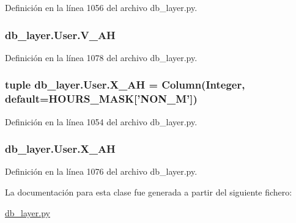 Definición en la línea 1056 del archivo db\-\_\-layer.\-py.

\hypertarget{classdb__layer_1_1_user_ae3a5a2f62fd59fb8e1527e18c5dd4681}{
\subsubsection[{V\-\_\-\-A\-H}]{\setlength{\rightskip}{0pt plus 5cm}db\-\_\-layer.\-User.\-V\-\_\-\-A\-H}}\label{classdb__layer_1_1_user_ae3a5a2f62fd59fb8e1527e18c5dd4681}


Definición en la línea 1078 del archivo db\-\_\-layer.\-py.

\hypertarget{classdb__layer_1_1_user_ada11ed7b535bdb0eb30e2e48c0cd5e8a}{
\subsubsection[{X\-\_\-\-A\-H}]{\setlength{\rightskip}{0pt plus 5cm}tuple db\-\_\-layer.\-User.\-X\-\_\-\-A\-H = Column(Integer, default={\bf H\-O\-U\-R\-S\-\_\-\-M\-A\-S\-K}\mbox{[}'N\-O\-N\-\_\-\-M'\mbox{]})\hspace{0.3cm}{\ttfamily [static]}}}\label{classdb__layer_1_1_user_ada11ed7b535bdb0eb30e2e48c0cd5e8a}


Definición en la línea 1054 del archivo db\-\_\-layer.\-py.

\hypertarget{classdb__layer_1_1_user_a3150f6b59d838d843a61afe7793c0c1b}{
\subsubsection[{X\-\_\-\-A\-H}]{\setlength{\rightskip}{0pt plus 5cm}db\-\_\-layer.\-User.\-X\-\_\-\-A\-H}}\label{classdb__layer_1_1_user_a3150f6b59d838d843a61afe7793c0c1b}


Definición en la línea 1076 del archivo db\-\_\-layer.\-py.



La documentación para esta clase fue generada a partir del siguiente fichero\-:\begin{DoxyCompactItemize}
\item 
\hyperlink{db__layer_8py}{db\-\_\-layer.\-py}\end{DoxyCompactItemize}
